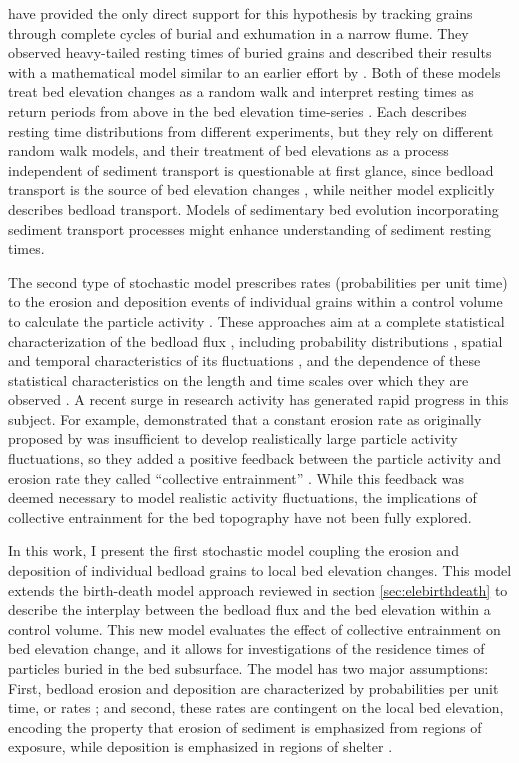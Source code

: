 \citet{Martin2014} have provided the only direct support for this hypothesis by tracking grains through complete cycles of burial and exhumation in a narrow flume.
They observed heavy-tailed resting times of buried grains and described their results with a mathematical model similar to an earlier effort by \citet{Voepel2013}.
Both of these models treat bed elevation changes as a random walk and interpret resting times as return periods from above in the bed elevation time-series \citep{Redner2007}.
Each describes resting time distributions from different experiments, but they rely on different random walk models, and their treatment of bed elevations as a process independent of sediment transport is questionable at first glance, since bedload transport is the source of bed elevation changes \citep{Wong2007}, while neither model explicitly describes bedload transport.
Models of sedimentary bed evolution incorporating sediment transport processes might enhance understanding of sediment resting times.

The second type of stochastic model prescribes rates (probabilities per unit time) to the erosion and deposition events of individual grains within a control volume to calculate the particle activity \citep{Einstein1950}.
These approaches aim at a complete statistical characterization of the bedload flux \citep{Furbish2012a,Fathel2015,Furbish2017,Heyman2016}, including probability distributions \citep{Ancey2006,Ancey2008}, spatial and temporal characteristics of its fluctuations \citep{Heyman2014a, Roseberry2012,Dhont2018}, and the dependence of these statistical characteristics on the length and time scales over which they are observed \citep{Singh2009,Singh2012,Saletti2015}.
A recent surge in research activity has generated rapid progress in this subject. 
For example, \citet{Ancey2006} demonstrated that a constant erosion rate as originally proposed by \citet{Einstein1950} was insufficient to develop realistically large particle activity fluctuations, so they added a positive feedback between the particle activity and erosion rate they called ``collective entrainment'' \citep{Ancey2008, Heyman2013,Heyman2014, Lee2018}.
While this feedback was deemed necessary to model realistic activity fluctuations, the implications of collective entrainment for the bed topography have not been fully explored.

In this work, I present the first stochastic model coupling the erosion and deposition of individual bedload grains to local bed elevation changes.
This model extends the birth-death model approach reviewed in section \ref{sec:elebirthdeath} to describe the interplay between the bedload flux and the bed elevation within a control volume.
This new model evaluates the effect of collective entrainment on bed elevation change, and it allows for investigations of the residence times of particles buried in the bed subsurface.
The model has two major assumptions: First, bedload erosion and deposition are characterized by probabilities per unit time, or rates \citep{Einstein1950, Ancey2008}; and second, these rates are contingent on the local bed elevation, encoding the property that erosion of sediment is emphasized from regions of exposure, while deposition is emphasized in regions of shelter \citep{Sawai1987, Wong2007}.


